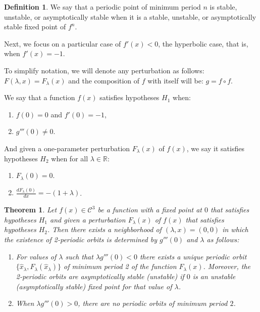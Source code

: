 \documentclass[12pt,a4paper]{report}
\newtheorem{teorema}{Theorem}[section]
\theoremstyle{definition}
\newtheorem{definicion}{Definition}[section]
\begin{document}
\begin{definicion}

We say that a periodic point of minimum period $n$ is stable, unstable, or asymptotically stable when it is a stable, unstable, or asymptotically stable fixed point of $f^n$.
    
\end{definicion}

Next, we focus on a particular case of $f'(x) < 0$, the hyperbolic case, that is, when $f'(x) = -1$.

To simplify notation, we will denote any perturbation as follows: \( F(\lambda,x) = F_{\lambda}(x) \) and the composition of $f$ with itself will be: $ g = f \circ f $.

We say that a function \( f(x) \) satisfies hypotheses \( H_1 \) when: 
\begin{enumerate}
    \item  \( f(0) = 0 \) and \( f'(0) = -1 \),
    \item  \( g'''(0) \neq 0 \).
\end{enumerate}

And given a one-parameter perturbation \( F_{\lambda}(x) \) of \( f(x) \), we say it satisfies hypotheses \( H_2 \) when for all $\lambda \in \mathbb{R}$:
\begin{enumerate}[start = 3]
    \item  \( F_{\lambda}(0) = 0 \).
    \item  \( \frac{dF_{\lambda}(0)}{dx} = -(1 + \lambda) \).
\end{enumerate}


\begin{teorema}
Let \( f(x) \in \mathcal{C}^3 \) be a function with a fixed point at \( 0 \) that satisfies hypotheses \( H_1 \) and given a perturbation \( F_{\lambda}(x) \) of \( f(x) \) that satisfies hypotheses \( H_2 \). Then there exists a neighborhood of \( (\lambda,x) = (0,0) \) in which the existence of 2-periodic orbits is determined by \( g'''(0) \) and \( \lambda \) as follows:

\begin{enumerate}
    \item  For values of $\lambda$ such that \( \lambda g'''(0) < 0 \) there exists a unique periodic orbit \( \{\hat{x}_\lambda, F_{\lambda}(\hat{x}_\lambda) \} \) of minimum period 2 of the function \( F_{\lambda}(x) \). Moreover, the 2-periodic orbits are asymptotically stable (unstable) if \( 0 \) is an unstable (asymptotically stable) fixed point for that value of \( \lambda \).

    \item When \( \lambda g'''(0) > 0 \), there are no periodic orbits of minimum period \( 2 \). 
\end{enumerate}

\end{teorema}
\end{document}
